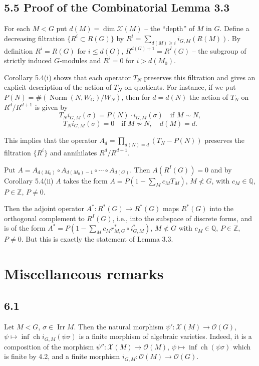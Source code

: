 \documentclass[12pt,a4paper]{article}
\theoremstyle{plain}
\theoremstyle{definition}
\theoremstyle{remark}
\DeclareMathOperator{\Irr}{Irr}
\DeclareMathOperator{\Norm}{Norm}
\DeclareMathOperator{\ch}{ch}
\newcommand{\cO}{\mathcal{O}}
\newcommand{\cX}{\mathcal{X}}
\newcommand{\bQ}{\mathbb{Q}}
\newcommand{\bZ}{\mathbb{Z}}
\begin{document}
\subsection*{5.5 Proof of the Combinatorial Lemma 3.3}

For each $M < G$ put $d(M) = \dim \cX(M)$ -- the ``depth'' of $M$ in $G$. Define a decreasing filtration $\{R^i \subset R(G)\}$ by $R^i = \sum_{d(M) \ge i} i_{G,M}(R(M))$. By definition $R^i = R(G)$ for $i \le d(G)$, $R^{d(G)+1} = R^I(G)$ -- the subgroup of strictly induced $G$-modules and $R^i = 0$ for $i > d(M_0)$.

Corollary 5.4(i) shows that each operator $T_N$ preserves this filtration and gives an explicit description of the action of $T_N$ on quotients. For instance, if we put $P(N) = \#(\Norm(N, W_G)/W_N)$, then for $d = d(N)$ the action of $T_N$ on $R^d/R^{d+1}$ is given by
\[
T_N i_{G,M}(\sigma) = P(N) \cdot i_{G,M}(\sigma) \quad \text{if } M \sim N,
\]
\[
T_N i_{G,M}(\sigma) = 0 \quad \text{if } M \not\sim N, \quad d(M) = d.
\]

This implies that the operator $A_d = \prod_{d(N)=d}(T_N - P(N))$ preserves the filtration $\{R^i\}$ and annihilates $R^d/R^{d+1}$.

Put $A = A_{d(M_0)} \circ A_{d(M_0)-1} \circ \cdots \circ A_{d(G)}$. Then $A(R^I(G)) = 0$ and by Corollary 5.4(ii) $A$ takes the form $A = P(1 - \sum_M c_M T_M)$, $M \not< G$, with $c_M \in \bQ$, $P \in \bZ$, $P \neq 0$.

Then the adjoint operator $A^*: R^*(G) \to R^*(G)$ maps $R^*(G)$ into the orthogonal complement to $R^I(G)$, i.e., into the subspace of discrete forms, and is of the form $A^* = P(1 - \sum_M c_M r_{M,G}^* \circ i_{G,M}^*)$, $M \not< G$ with $c_M \in \bQ$, $P \in \bZ$, $P \neq 0$. But this is exactly the statement of Lemma 3.3.

\section*{Miscellaneous remarks}

\subsection*{6.1}

Let $M < G$, $\sigma \in \Irr M$. Then the natural morphism $\psi': \cX(M) \to \cO(G)$, $\psi \mapsto \inf\ch i_{G,M}(\psi\sigma)$ is a finite morphism of algebraic varieties. Indeed, it is a composition of the morphism $\psi'': \cX(M) \to \cO(M)$, $\psi \mapsto \inf\ch(\psi\sigma)$ which is finite by 4.2, and a finite morphism $i_{G,M}: \cO(M) \to \cO(G)$.
\end{document}
